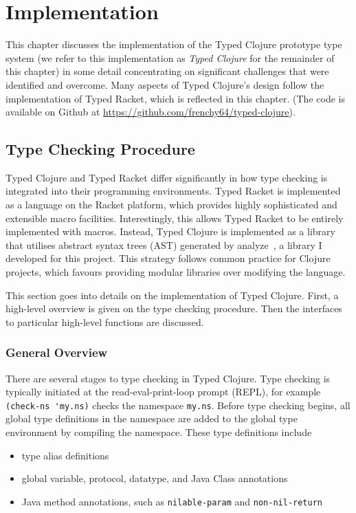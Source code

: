 \chapter{Implementation}

This chapter discusses the implementation of the Typed Clojure prototype type 
system (we refer to this implementation as \emph{Typed Clojure} for the remainder of this chapter)
in some detail concentrating on significant challenges that were identified and overcome.
Many aspects of Typed Clojure's design follow the implementation of Typed Racket,
which is reflected in this chapter. 
(The code is available on Github at \url{https://github.com/frenchy64/typed-clojure}).

\section{Type Checking Procedure}

Typed Clojure and Typed Racket differ significantly in how type checking
is integrated into their programming environments.
Typed Racket is implemented as a language on the
Racket platform, which provides highly sophisticated and extensible macro facilities.
Interestingly, this allows Typed Racket to be entirely implemented with macros.
Instead, Typed Clojure is implemented as a library that utilises abstract syntax trees (AST)
generated by analyze~\cite{Analyze2012}, a library I developed for this project.
This strategy follows common practice for Clojure projects, which favours providing modular libraries 
over modifying the language.

This section goes into details on the implementation of Typed Clojure.
First, a high-level overview is given on the type checking procedure.
Then the interfaces to particular high-level functions are discussed.

\subsection{General Overview}

There are several stages to type checking in Typed Clojure.
Type checking is typically initiated at the read-eval-print-loop prompt (REPL),
for example \lstinline|(check-ns 'my.ns)| checks the namespace \lstinline|my.ns|.
Before type checking begins, all global type definitions in the namespace
are added to the global type environment by compiling the namespace.
These type definitions include

\begin{itemize}
  \item type alias definitions
  \item global variable, protocol, datatype, and Java Class annotations
  \item Java method annotations, such as \lstinline|nilable-param| and \lstinline|non-nil-return|
\end{itemize}

